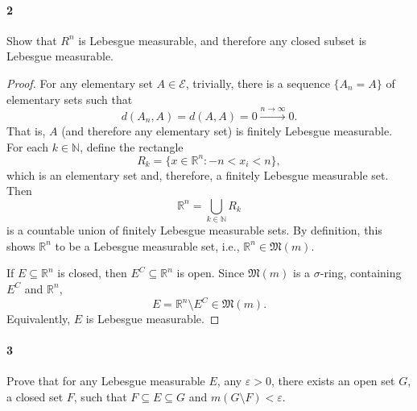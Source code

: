 \documentclass[12pt]{article}
\newenvironment{fullbox}{\begin{lrbox}{\savefullbox}\begin{minipage}{\dimexpr\textwidth-2\fboxsep\relax}}{\end{minipage}\end{lrbox}\begin{center}\framebox[\textwidth]{\usebox{\savefullbox}}\end{center}}
\newenvironment{pbox}[1][]{\begin{fullbox}\ifx#1\empty\else\paragraph{#1}\fi}{\end{fullbox}}
\newcommand{\N}{\mathbb{N}}
\newcommand{\R}{\mathbb{R}}
\newcommand{\eps}{\varepsilon}
\newcommand{\<}{\langle}
\renewcommand{\>}{\rangle}
\newcommand{\EE}{\mathcal{E}}
\newcommand{\MM}{\mathfrak{M}}
\begin{document}
\newpage
\begin{pbox}[2]
    Show that $R^n$ is Lebesgue measurable, and therefore any closed subset is Lebesgue measurable.
\end{pbox}

\begin{proof}
    For any elementary set $A \in \EE$, trivially, there is a sequence $\{A_n = A\}$ of elementary sets such that
    \[
        d(A_n, A) = d(A, A) = 0 \xrightarrow{n \to \infty} 0.
    \]
    That is, $A$ (and therefore any elementary set) is finitely Lebesgue measurable. For each $k \in \N$, define the rectangle
    \[
        R_k = \{x \in \R^n : -n < x_i < n\},
    \]
    which is an elementary set and, therefore, a finitely Lebesgue measurable set. Then 
    \[
        \R^n = \bigcup_{k \in \N} R_k
    \]
    is a countable union of finitely Lebesgue measurable sets. By definition, this shows $\R^n$ to be a Lebesgue measurable set, i.e., $\R^n \in \MM(m)$.

    If $E \subseteq \R^n$ is closed, then $E^C \subseteq \R^n$ is open. Since $\MM(m)$ is a $\sigma$-ring, containing $E^C$ and $\R^n$,
    \[
        E = \R^n \setminus E^C \in \MM(m).
    \]
    Equivalently, $E$ is Lebesgue measurable.

\end{proof}



\newpage
\begin{pbox}[3]
    Prove that for any Lebesgue measurable $E$, any $\eps > 0$, there exists an open set $G$, a closed set $F$, such that $F \subseteq E \subseteq G$ and $m(G \setminus F) < \eps$.
\end{pbox}
\end{document}
